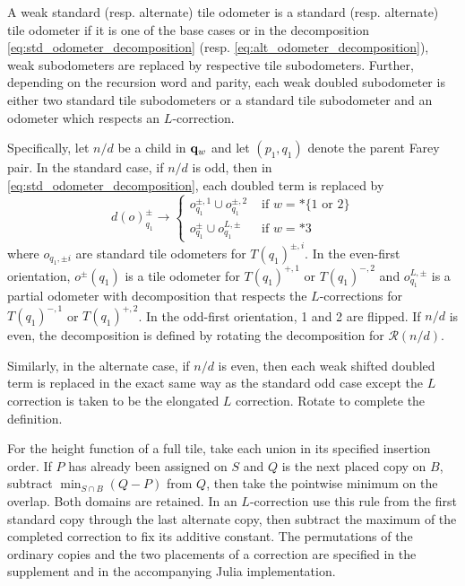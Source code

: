 \documentclass[12pt]{amsart}
\begin{document}
\begin{definition}
	A weak standard (resp. alternate) tile odometer is a standard (resp. alternate) tile odometer
	if it is one of the base cases or in the decomposition \eqref{eq:std_odometer_decomposition}  (resp. \eqref{eq:alt_odometer_decomposition}), 
	weak subodometers are replaced by respective tile subodometers. Further, depending on the recursion word and parity, each weak doubled subodometer is either two standard tile subodometers or a standard tile subodometer and an odometer which respects an $L$-correction. 

	Specifically, let $n/d$ be a child in $\mathbf{q}_{w}$ and let $(p_1, q_1)$ denote the parent Farey pair. In the standard case, if $n/d$ is odd, then in \eqref{eq:std_odometer_decomposition}, each doubled term is replaced by
	\[
	d(o)_{q_1}^{\pm} \to
	\begin{cases}
	o_{q_1}^{\pm,1} \cup o_{q_1}^{\pm,2} &\mbox{ if $w = *\mbox{\{1 or 2\}}$} \\
	o_{q_1}^{\pm} \cup o^{L,\pm}_{q_1} &\mbox{ if $w = *3$}
	\end{cases}
	\]
	where $o_{q_1, \pm i}$ are standard tile odometers for $T(q_1)^{\pm, i}$. In the even-first orientation, 
	$o^{\pm}(q_1)$ is a tile odometer for $T(q_1)^{+,1}$ or $T(q_1)^{-,2}$ and $o^{L,\pm}_{q_1}$ is a partial odometer with decomposition
	that respects the $L$-corrections for $T(q_1)^{-,1}$ or $T(q_1)^{+,2}$. In the odd-first orientation, 1 and 2 are flipped.
	If $n/d$ is even, the decomposition is defined by rotating the decomposition for $\mathcal{R}(n/d)$. 
	
	Similarly, in the alternate case, if $n/d$ is even, then each weak shifted doubled term is replaced in the exact same way 
	as the standard odd case except the $L$ correction is taken to be the elongated $L$ correction. Rotate to complete the definition. 


\end{definition}
For the height function of a full tile, take each union in its specified insertion order. If $P$ has already been assigned on $S$ and $Q$ is the next placed copy on $B$, subtract $\min_{S\cap B}(Q-P)$ from $Q$, then take the pointwise minimum on the overlap. Both domains are retained. In an $L$-correction use this rule from the first standard copy through the last alternate copy, then subtract the maximum of the completed correction to fix its additive constant. The permutations of the ordinary copies and the two placements of a correction are specified in the supplement and in the accompanying Julia implementation.
\end{document}
